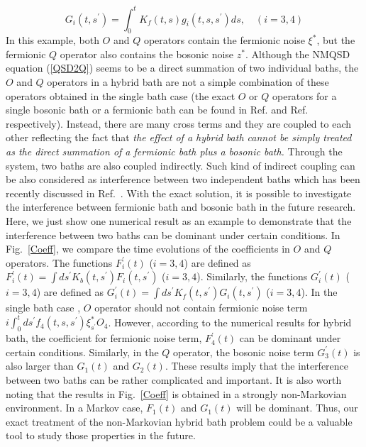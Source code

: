 \documentclass[preprint]{elsarticle}
\begin{document}
\begin{equation}
G_{i}(t,s^{\prime})=\int_{0}^{t}K_{f}(t,s)g_{i}(t,s,s^{\prime})ds,\quad(i=3,4)
\end{equation}
In this example, both $O$ and $Q$ operators contain the fermionic
noise $\xi^{*}$, but the fermionic $Q$ operator also contains
the bosonic noise $z^{*}$. Although the NMQSD equation (\ref{QSD2Q})
seems to be a direct summation of two individual baths, the $O$ and $Q$ operators
in a hybrid bath are not a simple combination of these operators obtained in
the single bath case (the exact $O$ or $Q$ operators for a single
bosonic bath or a fermionic bath can be found in Ref. \cite{Xinyu2011}
and Ref. \cite{ZhaoFB} respectively). Instead, there are many cross
terms and they are coupled to each other reflecting
the fact that \textit{the effect of a hybrid bath cannot be simply treated
as the direct summation of a fermionic bath plus a bosonic bath.}
Through the system, two baths are also coupled indirectly. Such kind
of indirect coupling can be also considered as interference between
two independent baths which has been recently discussed in Ref.~\cite{Lukin}.
With the exact solution, it is possible to investigate the interference
between fermionic bath and bosonic bath in the future research. Here, we just
show one numerical result as an example to demonstrate that the interference
between two baths can be dominant under certain conditions. In Fig.~\ref{Coeff}, we compare the time evolutions
of the coefficients in $O$ and $Q$ operators. The functions $F_{i}^{\prime}(t)$
($i=3,4$) are defined as $F_{i}^{\prime}(t)=\int ds^{\prime}K_{b}(t,s^{\prime})F_{i}(t,s^{\prime})$
($i=3,4$). Similarly, the functions $G_{i}^{\prime}(t)$ ($i=3,4$)
are defined as $G_{i}^{\prime}(t)=\int ds^{\prime}K_{f}(t,s^{\prime})G_{i}(t,s^{\prime})$
($i=3,4$). In the single bath case \cite{Xinyu2011}, $O$ operator
should not contain fermionic noise term $i\int_{0}^{t}ds^{\prime}f_{4}(t,s,s^{\prime})\xi_{s^{\prime}}^{*}O_{4}$.
However, according to the numerical results for hybrid bath, the coefficient
for fermionic noise term, $F_{4}^{\prime}(t)$ can be dominant under
certain conditions. Similarly, in the $Q$ operator, the bosonic noise
term $G_{3}^{\prime}(t)$ is also larger than $G_{1}(t)$ and $G_{2}(t)$.
These results imply that the interference between two baths can be
rather complicated and important. It is also worth noting that the results in Fig.~\ref{Coeff}
is obtained in a strongly non-Markovian environment. In a Markov case, $F_1(t)$ and $G_1(t)$ will be dominant. Thus, our exact treatment of the non-Markovian hybrid bath problem could be a valuable tool to study those properties in the future.
\end{document}
